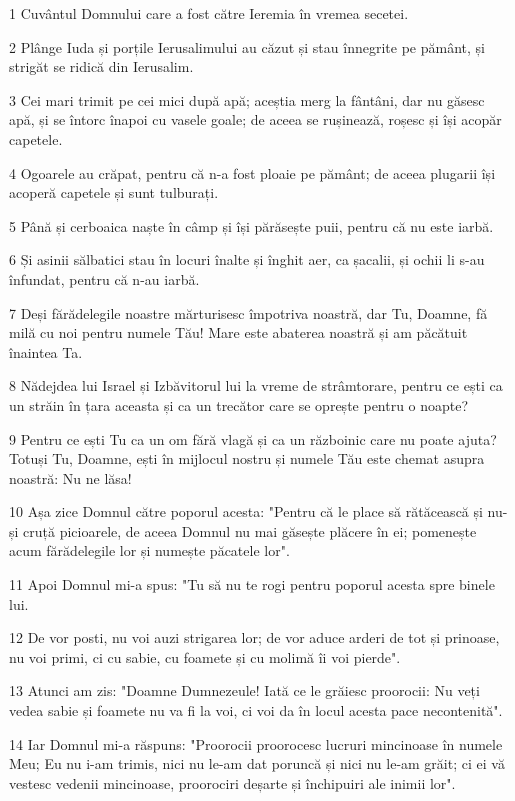 \par 1 Cuvântul Domnului care a fost către Ieremia în vremea secetei.
\par 2 Plânge Iuda și porțile Ierusalimului au căzut și stau înnegrite pe pământ, și strigăt se ridică din Ierusalim.
\par 3 Cei mari trimit pe cei mici după apă; aceștia merg la fântâni, dar nu găsesc apă, și se întorc înapoi cu vasele goale; de aceea se rușinează, roșesc și își acopăr capetele.
\par 4 Ogoarele au crăpat, pentru că n-a fost ploaie pe pământ; de aceea plugarii își acoperă capetele și sunt tulburați.
\par 5 Până și cerboaica naște în câmp și își părăsește puii, pentru că nu este iarbă.
\par 6 Și asinii sălbatici stau în locuri înalte și înghit aer, ca șacalii, și ochii li s-au înfundat, pentru că n-au iarbă.
\par 7 Deși fărădelegile noastre mărturisesc împotriva noastră, dar Tu, Doamne, fă milă cu noi pentru numele Tău! Mare este abaterea noastră și am păcătuit înaintea Ta.
\par 8 Nădejdea lui Israel și Izbăvitorul lui la vreme de strâmtorare, pentru ce ești ca un străin în țara aceasta și ca un trecător care se oprește pentru o noapte?
\par 9 Pentru ce ești Tu ca un om fără vlagă și ca un războinic care nu poate ajuta? Totuși Tu, Doamne, ești în mijlocul nostru și numele Tău este chemat asupra noastră: Nu ne lăsa!
\par 10 Așa zice Domnul către poporul acesta: "Pentru că le place să rătăcească și nu-și cruță picioarele, de aceea Domnul nu mai găsește plăcere în ei; pomenește acum fărădelegile lor și numește păcatele lor".
\par 11 Apoi Domnul mi-a spus: "Tu să nu te rogi pentru poporul acesta spre binele lui.
\par 12 De vor posti, nu voi auzi strigarea lor; de vor aduce arderi de tot și prinoase, nu voi primi, ci cu sabie, cu foamete și cu molimă îi voi pierde".
\par 13 Atunci am zis: "Doamne Dumnezeule! Iată ce le grăiesc proorocii: Nu veți vedea sabie și foamete nu va fi la voi, ci voi da în locul acesta pace necontenită".
\par 14 Iar Domnul mi-a răspuns: "Proorocii proorocesc lucruri mincinoase în numele Meu; Eu nu i-am trimis, nici nu le-am dat poruncă și nici nu le-am grăit; ci ei vă vestesc vedenii mincinoase, proorociri deșarte și închipuiri ale inimii lor".
